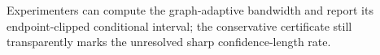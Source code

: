 Experimenters can compute the graph-adaptive bandwidth and report its endpoint-clipped conditional interval; the conservative certificate still transparently marks the unresolved sharp confidence-length rate.
